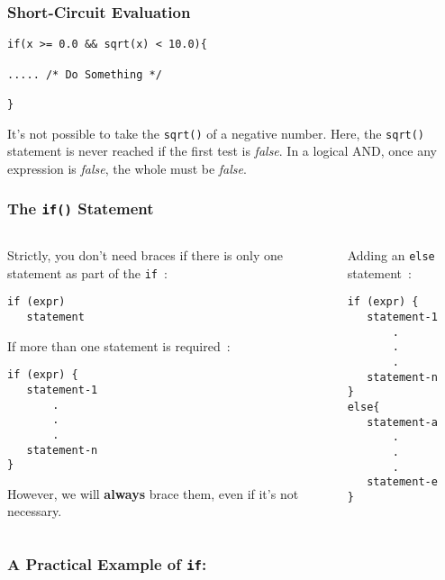 \begin{frame}[fragile]
\frametitle{Short-Circuit Evaluation}

\begin{lstlisting}[style=basicc,numbers=none]
if(x >= 0.0 && sqrt(x) < 10.0){

..... /* Do Something */

}
\end{lstlisting}

It's not possible to take the \verb^sqrt()^ of a negative number.
Here, the \verb^sqrt()^ statement is never reached if the first test is {\it false}.
In a logical AND, once any expression is {\it false}, the whole must
be {\it false}.
\end{frame}


\begin{frame}[fragile]
\frametitle{The {\tt if()} Statement}

\begin{columns}

\begin{column}{0.45\textwidth}
Strictly, you don't need braces if there is only one statement as part of the {\tt if}~:
\begin{lstlisting}[style=basicc,numbers=none]
if (expr)
   statement
\end{lstlisting}

If more than one statement is required~:
\begin{lstlisting}[style=basicc,numbers=none]
if (expr) {
   statement-1
       .
       .
       .
   statement-n
}
\end{lstlisting}
However, we will {\bf always} brace them, even if it's not necessary.
\end{column}

\begin{column}{0.45\textwidth}
Adding an \verb^else^ statement~:

\begin{lstlisting}[style=basicc,numbers=none]
if (expr) {
   statement-1
       .
       .
       .
   statement-n
}
else{
   statement-a
       .
       .
       .
   statement-e
}
\end{lstlisting}
\end{column}

\end{columns}
\end{frame}

\begin{frame}[fragile]
\frametitle{A Practical Example of {\tt if}:}
\begin{columns}

\begin{column}{0.5\textwidth}

\end{column}

\begin{column}{0.40\textwidth}
\end{column}

\end{columns}
\end{frame}

